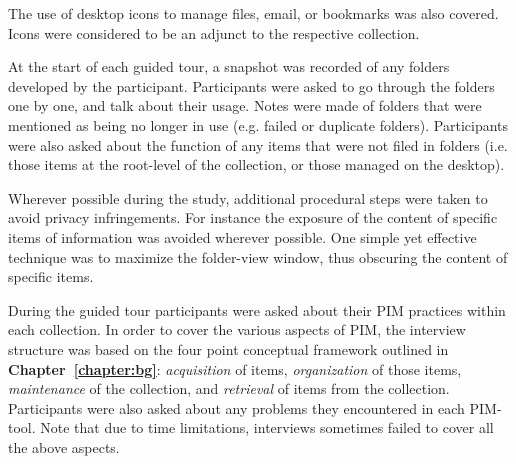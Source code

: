 The use of desktop icons to manage files, email, or bookmarks was also covered.  Icons were considered to be an adjunct to the respective collection.  

At the start of each guided tour, a snapshot was recorded of any folders developed by the participant.  Participants were asked to go through the folders one by one, and talk about their usage. Notes were made of folders that were mentioned as being no longer in use (e.g. failed or duplicate folders).  Participants were also asked about the function of any items that were not filed in folders (i.e. those items at the root-level of the collection, or those managed on the desktop). 

Wherever possible during the study, additional procedural steps were taken to avoid privacy infringements. For instance the exposure of the content of specific items of information was avoided wherever possible. One simple yet effective technique was to maximize the folder-view window, thus obscuring the content of specific items.

During the guided tour participants were asked about their PIM practices within each collection. In order to cover the various aspects of PIM, the interview structure was based on the four point conceptual framework outlined in \textbf{Chapter~\ref{chapter:bg}}: \textit{acquisition} of items, \textit{organization} of those items, \textit{maintenance} of the collection, and \textit{retrieval} of items from the collection.  Participants were also asked about any problems they encountered in each PIM-tool.  Note that due to time limitations, interviews sometimes failed to cover all the above aspects. %



